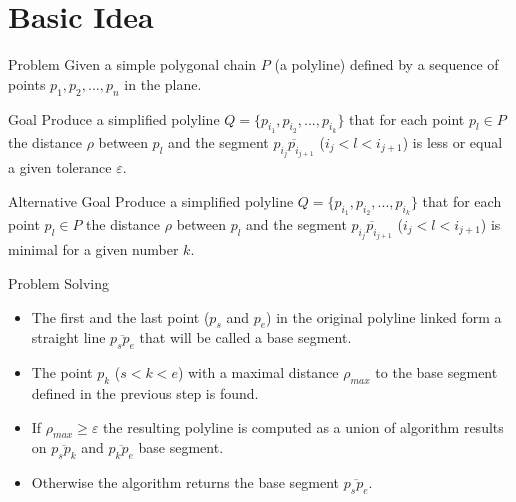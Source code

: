 \documentclass[10pt]{beamer}
\begin{document}
\section{Basic Idea}

\begin{frame}{Problem}
Given a simple polygonal chain $P$  (a polyline) defined by a sequence of points $p_{1},p_{2},...,p_{n}$ in the plane. 

\begin{alertblock}{Goal}
Produce a simplified polyline  $Q=\{p_{i_{1}},p_{i_{2}},...,p_{i_{k}}\}$
that for each point $p_{l}\in P$ the distance $\rho$ between $p_{l}$
and the segment $\overline{p_{i_{j}}p_{i_{j+1}}}$ ($i_{j} < l < i_{j+1}$) 
is less or equal a given tolerance $\varepsilon$.
\end{alertblock}

\begin{alertblock}{Alternative Goal}
Produce a simplified polyline  $Q=\{p_{i_{1}},p_{i_{2}},...,p_{i_{k}}\}$
that for each point $p_{l}\in P$ the distance $\rho$ between $p_{l}$
and the segment $\overline{p_{i_{j}}p_{i_{j+1}}}$ ($i_{j} < l < i_{j+1}$)   
is  minimal for a given number $k$.
\end{alertblock}

\end{frame}

\begin{frame}{Problem Solving}
	\begin{itemize}
		\item %
			  The first and the last point ($p_{s}$ and $p_{e}$)  in the original polyline 
			  linked form a straight line $\overline{p_sp_e}$ that will be called a \alert{base segment}.		
		\item %
			  The point $p_k$ ($s <  k < e$) with a maximal distance $\rho_{max}$ 
			  to the base segment defined in the previous step is found. 
		\item %
		      If $\rho_{max} \geq \varepsilon$ the resulting polyline is computed 
		      as a union of algorithm results on $\overline{p_{s}p_k}$ 
		      and $\overline{p_kp_{e}}$   base segment.
		\item %
			  Otherwise the algorithm returns the base segment $\overline{p_sp_e}$.
	\end{itemize}
\end{frame}
\end{document}

